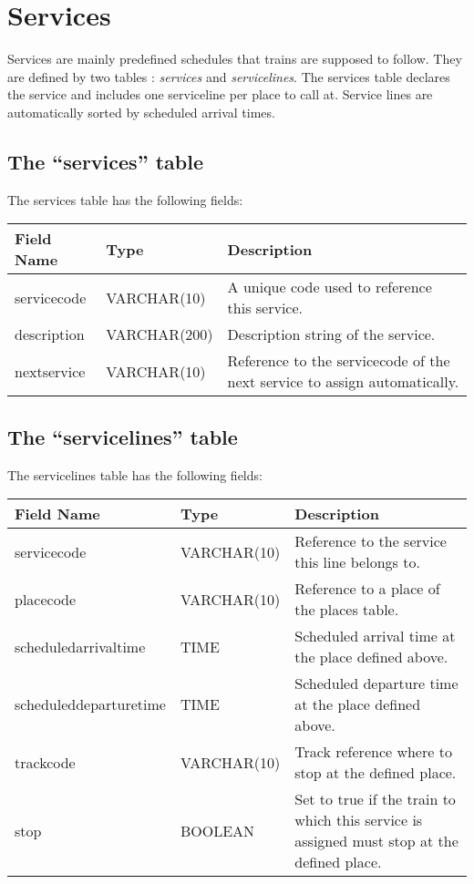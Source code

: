 \documentclass[12pt,a4paper]{article}
\begin{document}
\section{Services}

Services are mainly predefined schedules that trains are supposed to follow. They are defined by two tables : \textit{services} and \textit{servicelines}. The services table declares the service and includes one serviceline per place to call at. Service lines are automatically sorted by scheduled arrival times.

\subsection{The ``services'' table}
The services table has the following fields:
\begin{center}
\begin{tabular}{|l|l|p{10cm}|}
\hline
\textbf{Field Name}&\textbf{Type}&\textbf{Description}\\
\hline
servicecode&VARCHAR(10)&A unique code used to reference this service.\\
description&VARCHAR(200)&Description string of the service.\\
nextservice&VARCHAR(10)&Reference to the servicecode of the next service to assign automatically.\\
\hline
\end{tabular}
\end{center}

\subsection{The ``servicelines'' table}
The servicelines table has the following fields:
\begin{center}
\begin{tabular}{|l|l|p{10cm}|}
\hline
\textbf{Field Name}&\textbf{Type}&\textbf{Description}\\
\hline
servicecode&VARCHAR(10)&Reference to the service this line belongs to.\\
\hline
placecode&VARCHAR(10)&Reference to a place of the places table.\\
\hline
scheduledarrivaltime&TIME&Scheduled arrival time at the place defined above.\\
\hline
scheduleddeparturetime&TIME&Scheduled departure time at the place defined above.\\
\hline
trackcode&VARCHAR(10)&Track reference where to stop at the defined place.\\
\hline
stop&BOOLEAN&Set to true if the train to which this service is assigned must stop at the defined place.\\
\hline
\end{tabular}
\end{center}
\end{document}
